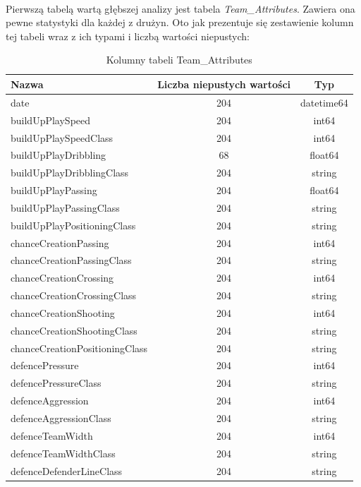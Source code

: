     ~
    
    Pierwszą tabelą wartą głębszej analizy jest tabela \emph{Team\_Attributes}. Zawiera ona pewne statystyki dla każdej z drużyn. Oto jak prezentuje się zestawienie kolumn tej tabeli wraz z ich typami i liczbą wartości niepustych:
    
    \begin{table}[H]
    \caption{Kolumny tabeli Team\_Attributes}
    \centering\footnotesize%
    \begin{tabular}{l c c}
    \toprule
        Nazwa & Liczba niepustych wartości & Typ \\
    \midrule
        date & 204 & datetime64 \\
        buildUpPlaySpeed & 204 & int64 \\
        buildUpPlaySpeedClass & 204 & int64 \\
        buildUpPlayDribbling & 68 & float64 \\
        buildUpPlayDribblingClass & 204 & string \\
        buildUpPlayPassing & 204 & float64 \\
        buildUpPlayPassingClass & 204 & string \\
        buildUpPlayPositioningClass & 204 & string \\
        chanceCreationPassing & 204 & int64 \\
        chanceCreationPassingClass & 204 & string \\
        chanceCreationCrossing & 204 & int64 \\ 
        chanceCreationCrossingClass & 204 & string \\        
        chanceCreationShooting & 204 & int64 \\  
        chanceCreationShootingClass & 204 & string \\
        chanceCreationPositioningClass & 204 & string \\
        defencePressure & 204 & int64 \\
        defencePressureClass & 204 & string \\
        defenceAggression & 204 & int64 \\  
        defenceAggressionClass & 204 & string \\
        defenceTeamWidth & 204 & int64 \\
        defenceTeamWidthClass & 204 & string \\
        defenceDefenderLineClass & 204 & string \\
    \bottomrule
    \end{tabular}
    \end{table}
    
